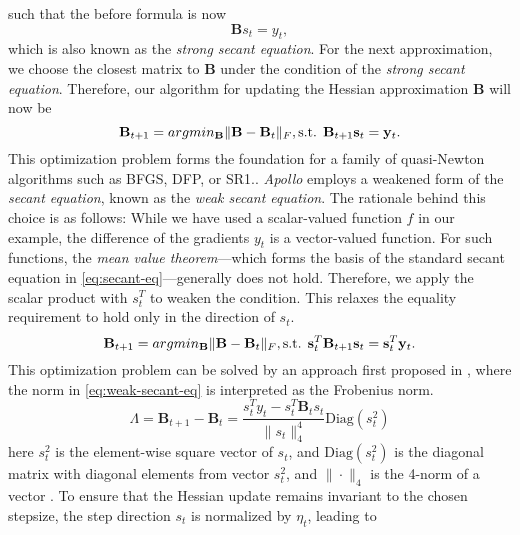 such that the before formula is now
\label{eq:secant-eq}
\begin{equation}
    \mathbf{B}s_t = y_t,
\end{equation}
which is also known as the \emph{strong secant equation}. For the next approximation, we choose the
closest matrix to $\mathbf{B}$ under the condition of the \emph{strong secant equation}.
Therefore, our algorithm for updating
the Hessian approximation $\mathbf{B}$ will now be 
\begin{equation}
    \mathbf{B}_{t+1} = argmin_{\mathbf{B}} \|\mathbf{B} - \mathbf{B}_t\|_F,\\
    \text{s.t. }  \mathbf{B}_{t+1}\mathbf{s}_t = \mathbf{y}_t.
\end{equation}
This optimization problem forms the foundation for a family of quasi-Newton algorithms
such as BFGS\cite{BFGS}, DFP\cite{DFP}, or SR1\cite{SR1}.\cite{apollo}.
\emph{Apollo} employs a weakened form of the \emph{secant equation}, known as the \emph{weak secant equation}. The rationale behind this choice is as follows:
While we have used a scalar-valued function $f$ in our example, the difference of the gradients $y_t$
is a vector-valued function. For such functions, the \emph{mean value theorem}—which forms the basis of the standard secant equation in \ref{eq:secant-eq}—generally does not hold\cite{apollo}. 
Therefore, we apply the scalar product with $s_t^T$ to weaken the condition. This relaxes the equality requirement to hold only in the direction of $s_t$.
\begin{equation}
    \label{eq:weak-secant-eq}
    \mathbf{B}_{t+1} = argmin_{\mathbf{B}} \|\mathbf{B} - \mathbf{B}_t\|_F, \\
    \text{s.t. } \mathbf{s}^T_t \mathbf{B}_{t+1}\mathbf{s}_t =\mathbf{s}^T_t \mathbf{y}_t.
\end{equation}
This optimization problem can be solved by an approach first proposed in \cite{Zhu1999TheQR},
where the norm in \ref{eq:weak-secant-eq} is interpreted as the Frobenius norm.
\begin{equation}
    \label{eq:apollo-update}
    \Lambda= \mathbf{B}_{t+1} - \mathbf{B}_t = \frac{s_t^T y_t - s_t^T \mathbf{B}_t s_t}{\|s_t\|_4^4} \text{Diag}(s_t^2)
\end{equation}
here $s_t^2$ is the element-wise square vector of $s_t$, and $\text{Diag}(s_t^2)$ is the diagonal matrix with diagonal elements from vector $s_t^2$, and $\|\cdot\|_4$ is the 4-norm of a vector \cite{apollo}.
To ensure that the Hessian update remains invariant to the chosen stepsize, the step direction \( s_t \) is normalized by \( \eta_t \), leading to
